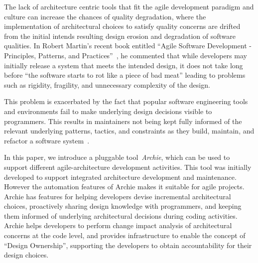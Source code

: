 The lack of architecture centric tools that fit the agile development paradigm and culture can increase the chances of quality degradation, where the implementation of architectural choices to satisfy quality concerns are drifted from the initial intends resulting design erosion and degradation of software qualities. In Robert Martin's recent book entitled ``Agile Software Development - Principles, Patterns, and Practices''~\cite{Martin2002}, he commented that while developers may initially release a system that meets the intended design, it does not take long before ``the software starts to rot like a piece of bad meat'' leading  to problems such as rigidity, fragility, and unnecessary complexity of the design. 

This problem is exacerbated by the fact that popular software engineering tools and environments fail to make underlying design decisions visible to programmers. This results in maintainers not being kept fully informed of the relevant underlying patterns, tactics, and constraints as they build, maintain, and refactor a software system~\cite{Booch:DrawPicture}.

In this paper, we introduce a pluggable tool~\emph{Archie}, which can be used to support different agile-architecture development activities. This tool was initially developed to support integrated architecture development and maintenance. However the automation features of Archie makes it suitable for agile projects. Archie has features for helping developers devise incremental architectural choices, proactively sharing design knowledge with programmers, and keeping them informed of underlying architectural decisions during coding activities. Archie helps developers to perform change impact analysis of architectural concerns at the code level, and provides infrastructure to enable the concept of ``Design Ownership'', supporting the developers to obtain accountability for their design choices.

